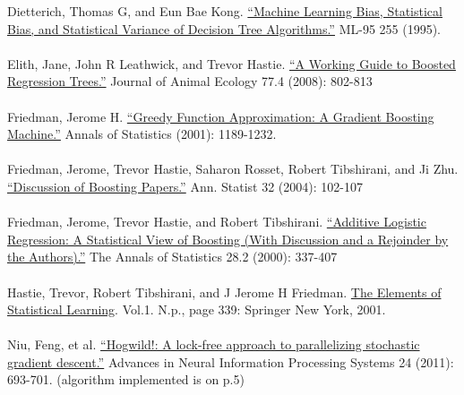 \documentclass[11pt]{article}
\begin{document}
Dietterich, Thomas G, and Eun Bae Kong. \href{http://www.iiia.csic.es/~vtorra/tr-bias.pdf}{“Machine Learning Bias, Statistical Bias, and Statistical Variance of Decision Tree Algorithms.”} ML-95 255 (1995).
\\
\\
Elith, Jane, John R Leathwick, and Trevor Hastie. \href{http://onlinelibrary.wiley.com/doi/10.1111/j.1365-2656.2008.01390.x/abstract}{“A Working Guide to Boosted Regression Trees.”} Journal of Animal Ecology 77.4 (2008): 802-813
\\
\\
Friedman, Jerome H. \href{http://statweb.stanford.edu/~jhf/ftp/trebst.pdf}{“Greedy Function Approximation: A Gradient Boosting Machine.”} Annals of Statistics (2001): 1189-1232.
\\
\\
Friedman, Jerome, Trevor Hastie, Saharon Rosset, Robert Tibshirani, and Ji Zhu. \href{http://web.stanford.edu/~hastie/Papers/boost_discussion.pdf}{“Discussion of Boosting Papers.”} Ann. Statist 32 (2004): 102-107
\\
\\
Friedman, Jerome, Trevor Hastie, and Robert Tibshirani. \href{http://projecteuclid.org/DPubS?service=UI&version=1.0&verb=Display&handle=euclid.aos/1016218223}{``Additive Logistic Regression: A Statistical View of Boosting (With Discussion and a Rejoinder by the Authors).”} The Annals of Statistics 28.2 (2000): 337-407
\\
\\
Hastie, Trevor, Robert Tibshirani, and J Jerome H Friedman. \href{http://www.stanford.edu/~hastie/local.ftp/Springer/OLD//ESLII_print4.pdf}{The Elements of Statistical Learning}. Vol.1. N.p., page 339: Springer New York, 2001. 
\\
\\
Niu, Feng, et al. \href{https://papers.nips.cc/paper/4390-hogwild-a-lock-free-approach-to-parallelizing-stochastic-gradient-descent.pdf}{“Hogwild!: A lock-free approach to parallelizing stochastic gradient descent.”} Advances in Neural Information Processing Systems 24 (2011): 693-701. (algorithm implemented is on p.5) 
\end{document}

